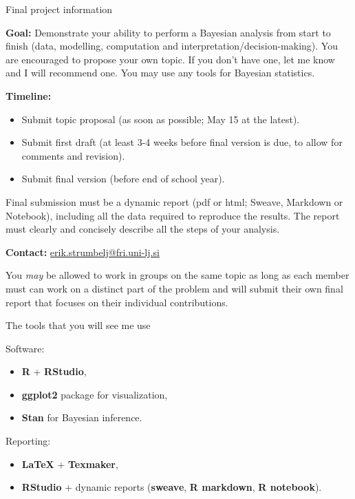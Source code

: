 \begin{frame}[fragile]{Final project information}

\begin{scriptsize}

\textbf{Goal:} Demonstrate your ability to perform a Bayesian analysis from start to finish (data, modelling, computation and interpretation/decision-making). You are encouraged to propose your own topic. If you don't have one, let me know and I will recommend one. You may use any tools for Bayesian statistics.

\bigskip

\textbf{Timeline:}

\begin{itemize}
\item Submit topic proposal (as soon as possible; May 15 at the latest).
\item Submit first draft (at least 3-4 weeks before final version is due, to allow for comments and revision).
\item Submit final version (before end of school year).
\end{itemize}

\bigskip

Final submission must be a dynamic report (pdf or html; Sweave, Markdown or Notebook), including all the data required to reproduce the results. The report must clearly and concisely describe all the steps of your analysis.

\bigskip

\textbf{Contact:} \url{erik.strumbelj@fri.uni-lj.si}

\bigskip

You \textit{may} be allowed to work in groups on the same topic as long as each member must can work on a distinct part of the problem and will submit their own final report that focuses on their individual contributions.

\end{scriptsize}
\end{frame}

\begin{frame}{The tools that you will see me use}

Software:
\begin{itemize}
\item \textbf{R} + \textbf{RStudio},
\item \textbf{ggplot2} package for visualization,
\item \textbf{Stan} for Bayesian inference.
\end{itemize}

\bigskip

Reporting:

\begin{itemize}
\item \textbf{LaTeX} + \textbf{Texmaker},
\item \textbf{RStudio} + dynamic reports (\textbf{sweave}, \textbf{R markdown}, \textbf{R notebook}).
\end{itemize}

\end{frame}


